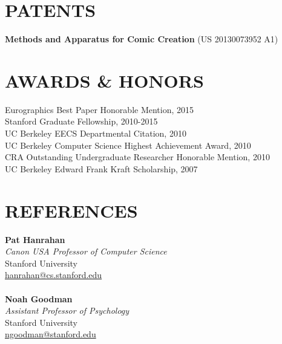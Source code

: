 \documentclass[line,margin]{res}
\begin{document}
\begin{resume}
\section{PATENTS}

\textbf{Methods and Apparatus for Comic Creation} (US 20130073952 A1)

\section{AWARDS \& HONORS}
Eurographics Best Paper Honorable Mention, 2015 \\
Stanford Graduate Fellowship, 2010-2015 \\ 
UC Berkeley EECS Departmental Citation, 2010 \\
UC Berkeley Computer Science Highest Achievement Award, 2010 \\
CRA Outstanding Undergraduate Researcher Honorable Mention, 2010 \\
UC Berkeley Edward Frank Kraft Scholarship, 2007 \\


\section{REFERENCES}

\textbf{Pat Hanrahan} \\
\emph{Canon USA Professor of Computer Science} \\
Stanford University  \\
\url{hanrahan@cs.stanford.edu}
\\ \\
\textbf{Noah Goodman} \\
\emph{Assistant Professor of Psychology} \\
Stanford University  \\
\url{ngoodman@stanford.edu}

\end{resume}
\end{document}

